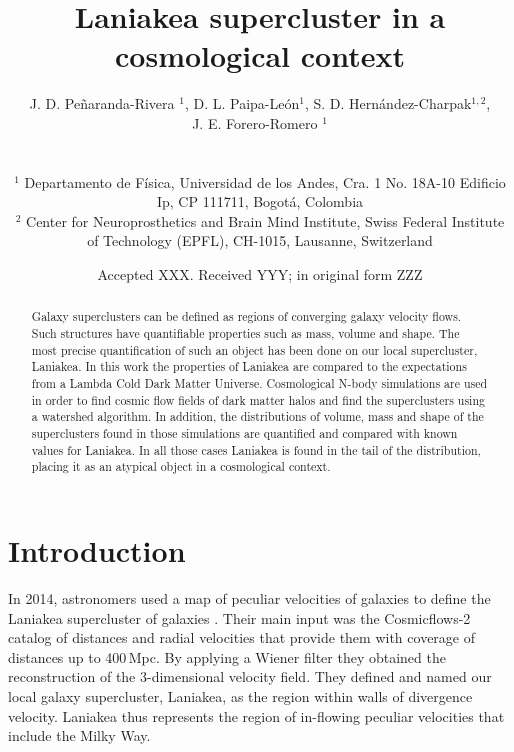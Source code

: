 \documentclass[usenatbib]{mnras}
\title[Laniakea in context]{Laniakea supercluster in a cosmological context}
\author[Pe\~naranda-Rivera et al.]{
\parbox[t]{\textwidth}{
    {J. D. Pe\~naranda-Rivera $^1$,} 
    {D. L. Paipa-Le\'on$^{1}$,}
    {S. D. Hern\'andez-Charpak$^{1,2}$,}\\
    {J. E. Forero-Romero $^{1}$}
}
\\\\
$^{1}$ Departamento de F\'isica, Universidad de los Andes, Cra. 1
  No. 18A-10 Edificio Ip, CP 111711, Bogot\'a, Colombia \\
$^{2}$ Center for Neuroprosthetics and Brain Mind Institute, Swiss Federal Institute of Technology (EPFL), CH-1015, Lausanne, Switzerland\\
}
\date{Accepted XXX. Received YYY; in original form ZZZ}
\begin{document}
\label{firstpage}
\pagerange{\pageref{firstpage}--\pageref{lastpage}}
\maketitle

\maketitle
\begin{abstract}
Galaxy superclusters can be defined as regions of converging galaxy
velocity flows. 
Such structures have quantifiable properties such as mass, volume and
shape. 
The most precise quantification of such an object has been done on our local supercluster, Laniakea. 
In this work the properties of Laniakea are compared to the
expectations from a Lambda Cold Dark Matter Universe. 
Cosmological N-body simulations are used in order to find cosmic flow
fields of dark matter halos and find the superclusters using a
watershed algorithm. 
In addition, the distributions of volume, mass and shape of the
superclusters found in those simulations are quantified and compared
with known values for Laniakea. 
In all those cases Laniakea is found in the tail of the distribution,
placing it as an atypical object in a cosmological context.  
\end{abstract}

\begin{keywords}
\end{keywords}




\section{Introduction}

In 2014, astronomers used a map  of peculiar velocities of galaxies to
define the Laniakea supercluster of galaxies
\citep{2014Natur.513...71T}.  
Their main input was the Cosmicflows-2 catalog of distances and radial
velocities that provide them with coverage of distances up to 400\,Mpc. 
By applying a Wiener filter they obtained the reconstruction of the
3-dimensional velocity field. They defined and named our local galaxy supercluster, 
Laniakea, as the region within walls of divergence velocity.  
Laniakea thus represents the region of in-flowing peculiar velocities
that include the Milky Way. 
\end{document}
